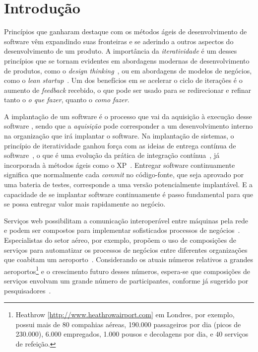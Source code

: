 \chapter{Introdução}
\label{cap:introducao}

Princípios que ganharam destaque com os métodos ágeis de desenvolvimento
de software vêm expandindo suas fronteiras e se aderindo a outros aspectos
do desenvolvimento de um produto. A importância da \emph{iteratividade}
é um desses princípios que se tornam evidentes em abordagens modernas de
desenvolvimento de produtos, como o \emph{design thinking}~\cite{Brown2009DesignThinking},
ou em abordagens de modelos de negócios, como o \emph{lean startup}~\cite{Ries2011Lean}.
Um dos benefícios em se acelerar o ciclo de iterações é o aumento
de \emph{feedback} recebido, o que pode ser usado
para se redirecionar e refinar tanto o \emph{o que fazer}, 
quanto o \emph{como fazer}.

A implantação de um software é o
processo que vai da aquisição à
execução desse software \cite{DEPL2006},
sendo que a \emph{aquisição} pode corresponder 
a um desenvolvimento interno na organização que irá implantar o software.
Na implantação de sistemas, 
o princípio de iteratividade
ganhou força com as ideias de entrega contínua de software~\cite{Humble2011Continuous},
o que é uma evolução da prática de integração contínua~\cite{Duvall2007Integration}, 
já incorporada à métodos ágeis como o XP~\cite{Beck1999XP}.
Entregar software continuamente significa que normalmente cada \emph{commit}
no código-fonte, que seja aprovado por uma bateria de testes,
corresponde a uma versão potencialmente implantável.
E a capacidade de se implantar software continuamente é passo fundamental
para que se possa entregar valor mais rapidamente ao negócio.

Serviços web possibilitam a comunicação interoperável entre máquinas pela rede~\cite{W3C2004WS}
e podem ser compostos para implementar sofisticados processos de negócios~\cite{Papazoglou2007State}.
Especialistas do setor aéreo, por exemplo, propõem o uso de composições de serviços
para automatizar os processos de negócios entre diferentes organizações
que coabitam um aeroporto~\cite{Choreos2012D6.2}.
Considerando os atuais números relativos a grandes
aeroportos\footnote{Heathrow [\url{http://www.heathrowairport.com}] em Londres, por exemplo, 
possui mais de 80 compahias aéreas, 190.000 passageiros por dia (picos de 230.000),
6.000 empregados, 1.000 pousos e decolagens por dia, e 40 serviços de refeição.}
e o crescimento futuro desses números, espera-se que
composições de serviços envolvam um grande número de participantes,
conforme já sugerido por 
pesquisadores~\cite{Valerie2011FutureInternet,Papadimitriou2009FutureInternet}.

